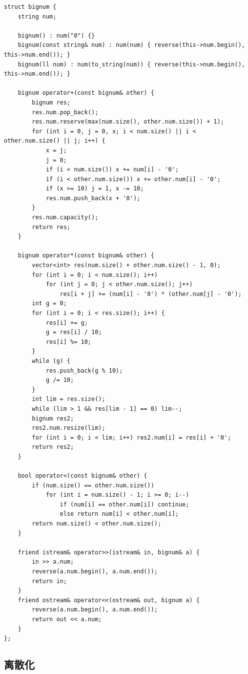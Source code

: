 \documentclass[UTF8, twoside]{ctexart}
\begin{document}
\begin{sloppypar}
\begin{lstlisting}[style=cpp]
struct bignum {
    string num;

    bignum() : num("0") {}
    bignum(const string& num) : num(num) { reverse(this->num.begin(), this->num.end()); }
    bignum(ll num) : num(to_string(num)) { reverse(this->num.begin(), this->num.end()); }

    bignum operator+(const bignum& other) {
        bignum res;
        res.num.pop_back();
        res.num.reserve(max(num.size(), other.num.size()) + 1);
        for (int i = 0, j = 0, x; i < num.size() || i < other.num.size() || j; i++) {
            x = j;
            j = 0;
            if (i < num.size()) x += num[i] - '0';
            if (i < other.num.size()) x += other.num[i] - '0';
            if (x >= 10) j = 1, x -= 10;
            res.num.push_back(x + '0');
        }
        res.num.capacity();
        return res;
    }

    bignum operator*(const bignum& other) {
        vector<int> res(num.size() + other.num.size() - 1, 0);
        for (int i = 0; i < num.size(); i++)
            for (int j = 0; j < other.num.size(); j++)
                res[i + j] += (num[i] - '0') * (other.num[j] - '0');
        int g = 0;
        for (int i = 0; i < res.size(); i++) {
            res[i] += g;
            g = res[i] / 10;
            res[i] %= 10;
        }
        while (g) {
            res.push_back(g % 10);
            g /= 10;
        }
        int lim = res.size();
        while (lim > 1 && res[lim - 1] == 0) lim--;
        bignum res2;
        res2.num.resize(lim);
        for (int i = 0; i < lim; i++) res2.num[i] = res[i] + '0';
        return res2;
    }

    bool operator<(const bignum& other) {
        if (num.size() == other.num.size())
            for (int i = num.size() - 1; i >= 0; i--)
                if (num[i] == other.num[i]) continue;
                else return num[i] < other.num[i];
        return num.size() < other.num.size();
    }

    friend istream& operator>>(istream& in, bignum& a) {
        in >> a.num;
        reverse(a.num.begin(), a.num.end());
        return in;
    }
    friend ostream& operator<<(ostream& out, bignum a) {
        reverse(a.num.begin(), a.num.end());
        return out << a.num;
    }
};
\end{lstlisting}

\subsection{离散化}


\end{sloppypar}
\end{document}
